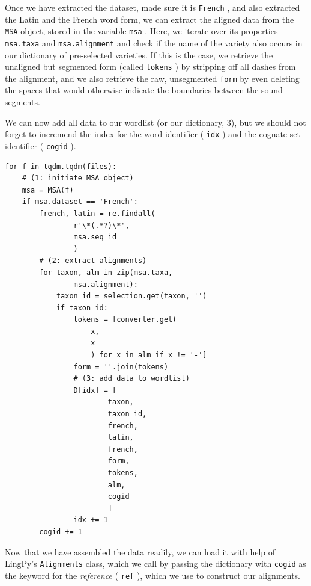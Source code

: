 \documentclass[
  a4paper,
  14pt,
  oneside,
  tablecaptionabove
]{scrbook}
\newcommand{\passthrough}[1]{#1}
\begin{document}
Once we have extracted the dataset, made sure it is
\passthrough{\lstinline!French!} , and also extracted the Latin and the
French word form, we can extract the aligned data from the
\passthrough{\lstinline!MSA!}-object, stored in the variable
\passthrough{\lstinline!msa!} . Here, we iterate over its properties
\passthrough{\lstinline!msa.taxa!} and
\passthrough{\lstinline!msa.alignment!} and check if the name of the
variety also occurs in our dictionary of pre-selected varieties. If this
is the case, we retrieve the unaligned but segmented form (called
\passthrough{\lstinline!tokens!} ) by stripping off all dashes from the
alignment, and we also retrieve the raw, unsegmented
\passthrough{\lstinline!form!} by even deleting the spaces that would
otherwise indicate the boundaries between the sound segments.

We can now add all data to our wordlist (or our dictionary, 3), but we
should not forget to incremend the index for the word identifier (
\passthrough{\lstinline!idx!} ) and the cognate set identifier (
\passthrough{\lstinline!cogid!} ).

\begin{lstlisting}
for f in tqdm.tqdm(files):
    # (1: initiate MSA object)
    msa = MSA(f)
    if msa.dataset == 'French':
        french, latin = re.findall(
                r'\*(.*?)\*',
                msa.seq_id
                )
        # (2: extract alignments)
        for taxon, alm in zip(msa.taxa,
                msa.alignment):
            taxon_id = selection.get(taxon, '')
            if taxon_id:
                tokens = [converter.get(
                    x,
                    x
                    ) for x in alm if x != '-']
                form = ''.join(tokens)
                # (3: add data to wordlist)
                D[idx] = [
                        taxon,
                        taxon_id,
                        french,
                        latin,
                        french,
                        form,
                        tokens,
                        alm,
                        cogid
                        ]
                idx += 1
        cogid += 1
\end{lstlisting}

Now that we have assembled the data readily, we can load it with help of
LingPy's \passthrough{\lstinline!Alignments!} class, which we call by
passing the dictionary with \passthrough{\lstinline!cogid!} as the
keyword for the \emph{reference} ( \passthrough{\lstinline!ref!} ),
which we use to construct our alignments.
\end{document}
